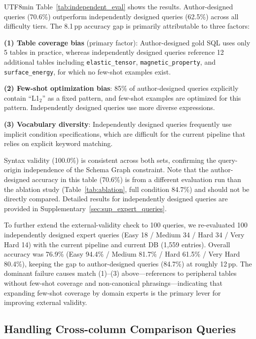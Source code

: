 \documentclass[sn-mathphys,Numbered]{sn-jnl}
\begin{document}
\begin{CJK}{UTF8}{min}
Table~\ref{tab:independent_eval} shows the results.
Author-designed queries (70.6\%) outperform independently designed
queries (62.5\%) across all difficulty tiers.
The 8.1\,pp accuracy gap is primarily attributable to three factors:

\textbf{(1) Table coverage bias} (primary factor):
Author-designed gold SQL uses only 5 tables in practice, whereas
independently designed queries reference 12 additional tables
including \texttt{elastic\_tensor}, \texttt{magnetic\_property},
and \texttt{surface\_energy}, for which no few-shot examples exist.

\textbf{(2) Few-shot optimization bias}:
85\% of author-designed queries explicitly contain ``L1$_2$'' as a
fixed pattern, and few-shot examples are optimized for this pattern.
Independently designed queries use more diverse expressions.

\textbf{(3) Vocabulary diversity}:
Independently designed queries frequently use implicit condition
specifications, which are difficult for the current pipeline that
relies on explicit keyword matching.

Syntax validity (100.0\%) is consistent across both sets,
confirming the query-origin independence of the Schema Graph
constraint.
Note that the author-designed accuracy in this table (70.6\%)
is from a different evaluation run than the ablation study
(Table~\ref{tab:ablation}, full condition 84.7\%) and should not
be directly compared.
Detailed results for independently designed queries are provided
in Supplementary~\ref{sec:sup_expert_queries}.

To further extend the external-validity check to 100 queries,
we re-evaluated 100 independently designed expert queries
(Easy 18 / Medium 34 / Hard 34 / Very Hard 14)
with the current pipeline and current DB (1{,}559 entries).
Overall accuracy was 76.9\%
(Easy 94.4\% / Medium 81.7\% / Hard 61.5\% / Very Hard 80.4\%),
keeping the gap to author-designed queries (84.7\%) at roughly 12\,pp.
The dominant failure causes match (1)--(3) above---references to
peripheral tables without few-shot coverage and non-canonical
phrasings---indicating that expanding few-shot coverage by domain
experts is the primary lever for improving external validity.

\subsection{Handling Cross-column Comparison Queries}
\label{sec:column_comparison}


\end{CJK}
\end{document}
